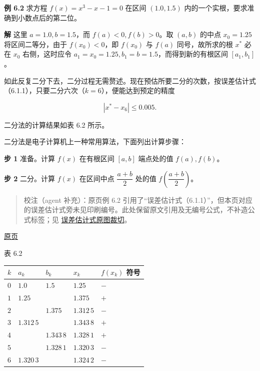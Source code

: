 \documentclass[
  10pt,
  fontset=fandol]{ctexart}
\newcounter{none} %
\begin{document}
\textbf{例 6.2} 求方程 \(f(x)=x^3-x-1=0\) 在区间 \((1.0,1.5)\) 内的一个实根，要求准确到小数点后的第二位。

\textbf{解} 这里 \(a=1.0,b=1.5\)，而 \(f(a)<0,f(b)>0\)。取 \((a,b)\) 的中点 \(x_0=1.25\) 将区间二等分，由于 \(f(x_0)<0\)，即 \(f(x_0)\) 与 \(f(a)\) 同号，故所求的根 \(x^*\) 必在 \(x_0\) 右侧，这时应令 \(a_1=x_0=1.25,b_1=b=1.5\)，而得到新的有根区间 \([a_1,b_1]\)。

如此反复二分下去，二分过程无需赘述。现在预估所要二分的次数，按误差估计式（6.1.1），只要二分六次（\(k=6\)），便能达到预定的精度

\[
|x^*-x_6|\leqslant0.005.
\]

二分法的计算结果如表 6.2 所示。

二分法是电子计算机上一种常用算法，下面列出计算步骤：

\textbf{步 1} 准备。计算 \(f(x)\) 在有根区间 \([a,b]\) 端点处的值 \(f(a),f(b)\)。

\textbf{步 2} 二分。计算 \(f(x)\) 在区间中点 \(\dfrac{a+b}{2}\) 处的值 \(f\left(\dfrac{a+b}{2}\right)\)。

\begin{quote}
校注（agent 补充）：原页例 6.2 引用了``误差估计式（6.1.1）''，但本页对应的误差估计式旁未见印刷编号。此处保留原文引用及无编号公式，不补造公式标签；见 \href{../assets/ch06/detail-p156-audit.png}{误差估计式原图裁切}。
\end{quote}

\href{../../source-images/pdf-157.jpeg}{原页}

表 6.2

{\def\LTcaptype{none} %
\begin{longtable}[]{@{}lllll@{}}
\toprule\noalign{}
\(k\) & \(a_k\) & \(b_k\) & \(x_k\) & \(f(x_k)\) 符号 \\
\midrule\noalign{}
\endhead
\bottomrule\noalign{}
\endlastfoot
\(0\) & \(1.0\) & \(1.5\) & \(1.25\) & \(-\) \\
\(1\) & \(1.25\) & & \(1.375\) & \(+\) \\
\(2\) & & \(1.375\) & \(1.312\,5\) & \(-\) \\
\(3\) & \(1.312\,5\) & & \(1.343\,8\) & \(+\) \\
\(4\) & & \(1.343\,8\) & \(1.328\,1\) & \(+\) \\
\(5\) & & \(1.328\,1\) & \(1.320\,3\) & \(-\) \\
\(6\) & \(1.320\,3\) & & \(1.324\,2\) & \(-\) \\
\end{longtable}
}
\end{document}
